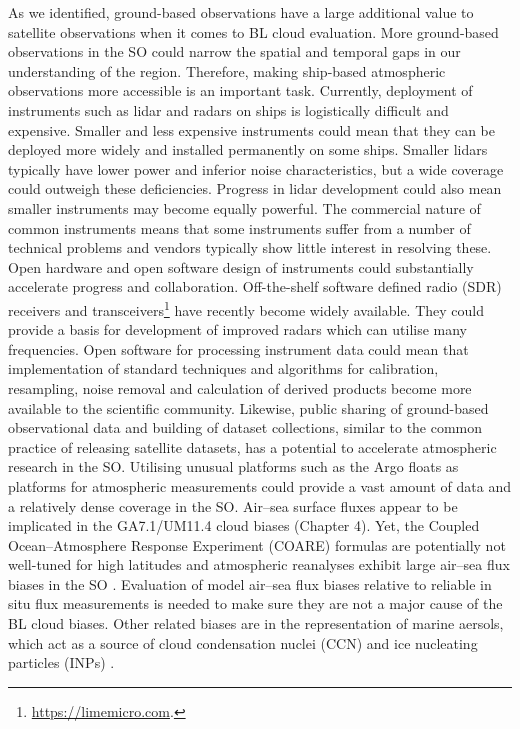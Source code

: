 As we identified, ground-based observations have a large additional value
to satellite observations when it comes to BL cloud evaluation. More
ground-based observations in the SO could narrow the spatial and temporal gaps
in our understanding of the region. Therefore, making ship-based atmospheric
observations more accessible is an important task. Currently, deployment
of instruments such as lidar and radars on ships is logistically difficult
and expensive. Smaller and less expensive instruments could mean that they
can be deployed more widely and installed permanently on some ships. Smaller
lidars typically have lower power and inferior noise characteristics,
but a wide coverage could outweigh these deficiencies. Progress in lidar
development could also mean smaller instruments may become equally powerful.
The commercial nature of common instruments means that some instruments
suffer from a number of technical problems and vendors typically show
little interest in resolving these. Open hardware and open software design of
instruments could substantially accelerate progress and collaboration.
Off-the-shelf software defined radio (SDR) receivers and
transceivers\footnote{\url{https://limemicro.com}.} have recently
become widely available. They could provide a basis for development of improved
radars which can utilise many frequencies. Open software for processing
instrument data could mean that implementation of standard techniques and
algorithms for calibration, resampling, noise removal and calculation of derived
products become more available to the scientific community. Likewise,
public sharing of ground-based observational data and building of dataset
collections, similar to the common practice of releasing satellite datasets,
has a potential to accelerate atmospheric research in the SO.
Utilising unusual platforms such as the Argo floats \citep{roemmich2009}
as platforms for atmospheric measurements could provide a vast amount of data and a relatively dense
coverage in the SO.
Air--sea surface fluxes appear to be implicated in the GA7.1/UM11.4 cloud biases
(Chapter 4). Yet, the Coupled Ocean–Atmosphere Response Experiment (COARE)
formulas are potentially not well-tuned for high latitudes and atmospheric
reanalyses exhibit large air--sea flux biases in the SO
\citep{cerovevcki2011}. Evaluation of model air--sea flux biases relative to
reliable in situ flux measurements is needed to make sure they are not
a major cause of the BL cloud biases. Other related biases are in the
representation of marine aersols, which act as a source of cloud condensation
nuclei (CCN) and ice nucleating particles (INPs) \citep{hartery2020a}.

